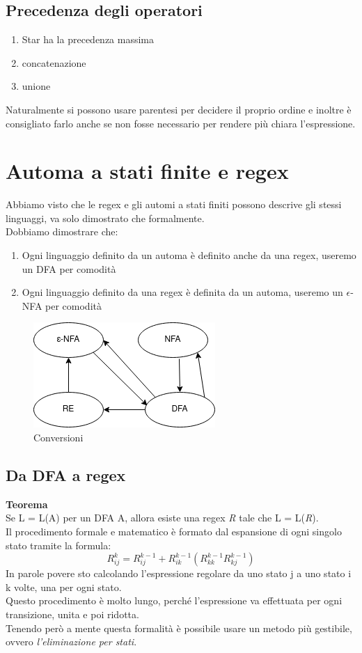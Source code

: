 \documentclass[12pt]{article}
\begin{document}
	\subsection{Precedenza degli operatori}
	\begin{enumerate}
		\item Star ha la precedenza massima
		\item concatenazione
		\item unione
	\end{enumerate}
	Naturalmente si possono usare parentesi per decidere il proprio ordine e inoltre è consigliato farlo anche se non fosse necessario per rendere più chiara l'espressione.

	\section{Automa a stati finite e regex}
	Abbiamo visto che le regex e gli automi a stati finiti possono descrive gli stessi linguaggi, va solo dimostrato che formalmente.
	\\ Dobbiamo dimostrare che:
	\begin{enumerate}
		\item Ogni linguaggio definito da un automa è definito anche da una regex, useremo un DFA per comodità
		\item Ogni linguaggio definito da una regex è definita da un automa, useremo un $\epsilon$-NFA per comodità
	\end{enumerate}

	\begin{figure}[ht]
		\includegraphics[scale = 0.7]{media/regex_conv.png}
		\centering
		\caption{Conversioni}
	\end{figure}

	\subsection{Da DFA a regex}
	\textbf{Teorema}
	\\ Se L = L(A) per un DFA A, allora esiste una regex \emph{R} tale che L = L(\emph{R}).
	\\ Il procedimento formale e matematico è formato dal espansione di ogni singolo stato tramite la formula:
	\[ R^{k}_{ij} =  R^{k-1}_{ij} + R^{k-1}_{ik} (R^{k-1}_{kk} R^{k-1}_{kj})\]
	In parole povere sto calcolando l'espressione regolare da uno stato j a uno stato i k volte, una per ogni stato.
	\\ Questo procedimento è molto lungo, perché l'espressione va effettuata per ogni transizione, unita e poi ridotta.
	\\ Tenendo però a mente questa formalità è possibile usare un metodo più gestibile, ovvero \emph{l'eliminazione per stati}.
\end{document}
